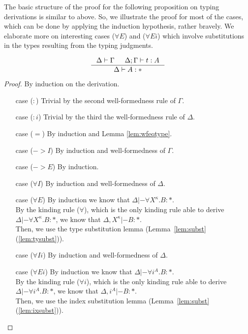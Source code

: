 The basic structure of the proof for the following proposition on typing
derivations is similar to above. So, we illustrate the proof for most of
the cases, which can be done by applying the induction hypothesis, rather
bravely. We elaborate more on interesting cases ($\forall E$) and ($\forall Ei$)
which involve substitutions in the types resulting from the typing judgments.
\begin{proposition}
\label{prop:wftype}
\[ \inference{ \Delta |- \Gamma & \Delta;\Gamma |- t : A}{ \Delta |- A : * }
\]
\end{proposition}
\begin{proof} By induction on the derivation.
\begin{itemize}
\item[case] ($:$)
	Trivial by the second well-formedness rule of $\Gamma$.
\item[case] ($:i$)
	Trivial by the third the well-formedness rule of $\Delta$.
\item[case] ($=$)
	By induction and Lemma \ref{lem:wfeqtype}.
\item[case] ($->$$I$)
	By induction and well-formedness of $\Gamma$.
\item[case] ($->$$E$)
	By induction.
\item[case] ($\forall I$)
	By induction and well-formedness of $\Delta$.
\item[case] ($\forall E$)
	By induction we know that $\Delta |- \forall X^\kappa.B : *$.\\
	By the kinding rule ($\forall$), which is the only kinding rule
	able to derive $\Delta |- \forall X^\kappa.B : *$, we know
	that $\Delta,X^\kappa |- B : *$.\\
	Then, we use the type substitution lemma
	(Lemma~\ref{lem:subst}(\ref{lem:tysubst})).
\item[case] ($\forall Ii$)
	By induction and well-formedness of $\Delta$.
\item[case] ($\forall Ei$)
	By induction we know that $\Delta |- \forall i^A.B : *$.\\
	By the kinding rule ($\forall i$), which is the only kinding rule
	able to derive $\Delta |- \forall i^A.B : *$, we know
	that $\Delta,i^A |- B : *$.\\
	Then, we use the index substitution lemma
	(Lemma~\ref{lem:subst}(\ref{lem:ixsubst})).\qedhere
\end{itemize}
\end{proof}

